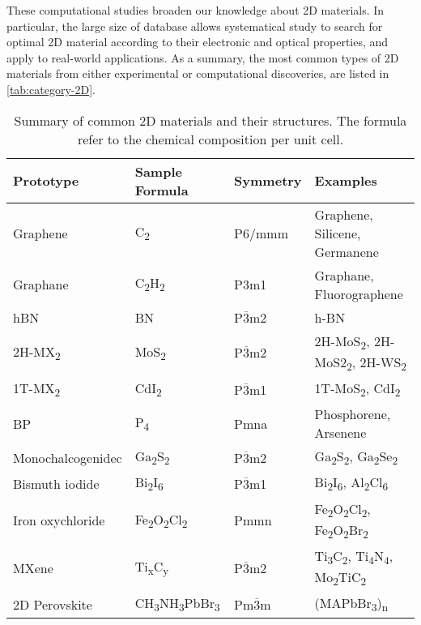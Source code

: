 These computational studies broaden our knowledge about 2D
materials. In particular, the large size of database allows
systematical study to search for optimal 2D material according to
their electronic and optical properties, and apply to real-world
applications. As a summary, the most common types of 2D materials from
either experimental or computational discoveries, are listed in
\autoref{tab:category-2D}.

\begin{table}[htbp]
  \centering
  \caption{Summary of common 2D materials and their structures. The
    formula refer to the chemical composition per unit cell.}
  \label{tab:category-2D}
  \begin{tabularx}{1.00\textwidth}{XXXX}
    \hline
    Prototype  & Sample Formula  & Symmetry & Examples \\
    \hline
    Graphene & C\textsubscript{2} &  P6/mmm & Graphene, Silicene, Germanene \\
    Graphane & C\textsubscript{2}H\textsubscript{2} &  P3m1 & Graphane, Fluorographene\\
    hBN      & BN                & P$\overline{3}$m2 & h-BN \\
    2H-MX\textsubscript{2} & MoS\textsubscript{2} & P$\overline{3}$m2 & 2H-MoS\textsubscript{2}, 2H-MoS2\textsubscript{2}, 2H-WS\textsubscript{2} \\
    1T-MX\textsubscript{2} & CdI\textsubscript{2} & P$\overline{3}$m1 & 1T-MoS\textsubscript{2}, CdI\textsubscript{2}\\
    BP & P\textsubscript{4} & Pmna & Phosphorene, Arsenene \\
    Monochalcogenidec & Ga\textsubscript{2}S\textsubscript{2} & P$\overline{3}$m2 & Ga\textsubscript{2}S\textsubscript{2}, Ga\textsubscript{2}Se\textsubscript{2} \\
    Bismuth iodide &  Bi\textsubscript{2}I\textsubscript{6} & P$\overline{3}$m1 & Bi\textsubscript{2}I\textsubscript{6}, Al\textsubscript{2}Cl\textsubscript{6} \\
    Iron oxychloride                &  Fe\textsubscript{2}O\textsubscript{2}Cl\textsubscript{2} & Pmmn & Fe\textsubscript{2}O\textsubscript{2}Cl\textsubscript{2}, Fe\textsubscript{2}O\textsubscript{2}Br\textsubscript{2}  \\
    MXene & Ti\textsubscript{x}C\textsubscript{y} & P$\overline{3}$m2 & Ti\textsubscript{3}C\textsubscript{2}, Ti\textsubscript{4}N\textsubscript{4}, Mo\textsubscript{2}TiC\textsubscript{2} \\
    2D Perovskite & CH\textsubscript{3}NH\textsubscript{3}PbBr\textsubscript{3} & Pm$\overline{3}$m & (MAPbBr\textsubscript{3})\textsubscript{n}\\
   \hline
\end{tabularx}
\end{table}


